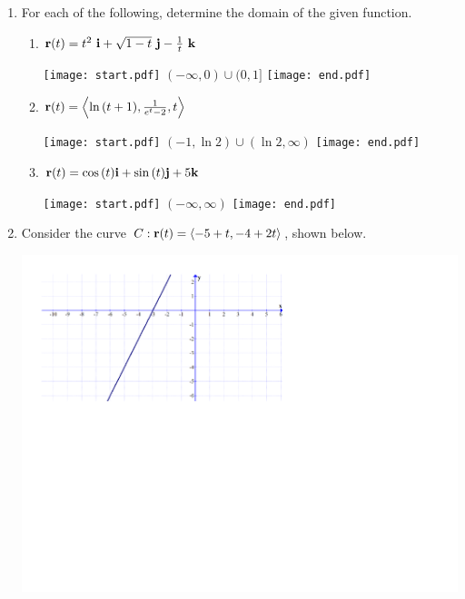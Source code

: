 \documentclass[12pt]{article}
\begin{document}
\begin{enumerate}

\item For each of the following, determine the domain of the given function.

\begin{enumerate}

\item ${\bf r}(t)=t^2\text{ }{\bf i}+\sqrt{1-t}\text{ }{\bf j}-\frac{1}{t}\text{ }{\bf k}$

\texttt{[image: start.pdf]}
{{$(-\infty,0)\cup(0,1]$}}
\texttt{[image: end.pdf]}


\item ${\bf r}(t)=\left\langle \ln{(t+1)}, \frac{1}{e^t-2}, t\right\rangle$

\texttt{[image: start.pdf]}
{{$(-1,\ln2)\cup(\ln2,\infty)$}}
\texttt{[image: end.pdf]}


\item ${\bf r}(t)=\cos{(t)}{\bf i}+\sin{(t)}{\bf j}+5{\bf k}$

\texttt{[image: start.pdf]}
{{$(-\infty,\infty)$}}
\texttt{[image: end.pdf]}


\end{enumerate}

\item Consider the curve $C: {\bf r}(t)=\langle -5+t,-4+2t\rangle$, shown below.

\begin{center}
\includegraphics[scale=0.58]{line.pdf}
\end{center}


\end{enumerate}
\end{document}
